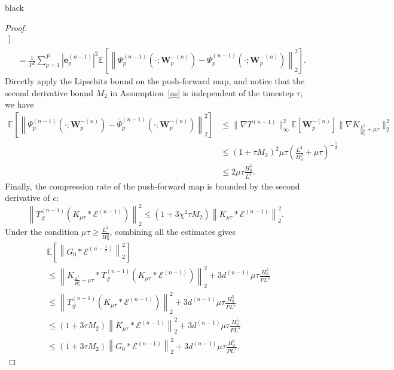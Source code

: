 \documentclass[review,onefignum,onetabnum]{siamart250211}
\begin{document}
\begin{color}{black}
\begin{proof}
\begin{equation}
\begin{aligned}
\Bigr]\\
&=\frac{1}{P^2}\sum_{p=1}^P |\mathbf{e}_p^{(n-1)}|^2\mathbb{E}\left[\left\|\Psi_p^{(n-1)}(\cdot;\mathbf{W}_p^{-(n)})-\overline{\Psi}_p^{(n-1)}(\cdot;\mathbf{W}_p^{-(n)})\right\|_2^2\right].
\end{aligned}
\end{equation}
Directly apply the Lipschitz bound on the push-forward map, and notice that the second derivative bound $M_2$ in Assumption~\ref{as} is independent of the timestep $\tau$, we have
\begin{equation}
\begin{aligned}
\mathbb{E}\left[\left\|\Psi_p^{(n-1)}(\cdot;\mathbf{W}_p^{-(n)})-\overline{\Psi}_p^{(n-1)}(\cdot;\mathbf{W}_p^{-(n)})\right\|_2^2\right]&\leq \|\nabla T^{(n-1)}\|_\infty^2 \mathbb{E}[\mathbf{W}_p^{-(n)}]\|\nabla K_{\frac{L^2}{H_0^2}+\mu\tau}\|_2^2\\
&\leq  (1+\tau M_2)^2 \mu \tau \left(\frac{L^2}{H_0^2}+\mu\tau\right)^{-\frac{5}{2}}\\
&\leq 2 \mu \tau \frac{H_0^5}{L^5}.
\end{aligned}
\end{equation}
Finally, the compression rate of the push-forward map is bounded by the second derivative of $c$:
\begin{equation}
\left\|T_\#^{(n-1)}(K_{\mu \tau} \ast \mathcal{E}^{(n-1)})\right\|_2^2 \leq (1+3\chi^2\tau M_2) \left\|K_{\mu \tau} \ast \mathcal{E}^{(n-1)}\right\|_2^2.
\end{equation}
Under the condition \(\mu \tau \geq \frac{L^2}{H_0^2}\), combining all the estimates gives
\begin{equation}
\begin{aligned}
&\mathbb{E}\left[\left\|G_0 \ast \mathcal{E}^{(n-\frac{1}{2})}\right\|_2^2\right] \\
&\leq \left\|K_{\frac{L^2}{H_0^2}+\mu \tau} \ast T_\#^{(n-1)}(K_{\mu \tau} \ast \mathcal{E}^{(n-1)} )\right\|_2^2+3d^{(n-1)}\mu\tau \frac{H_0^5}{PL^5}\\
&\leq \left\|T_\#^{(n-1)}(K_{\mu \tau} \ast \mathcal{E}^{(n-1)} )\right\|_2^2+3d^{(n-1)}\mu\tau \frac{H_0^5}{PL^5}\\
&\leq (1+3\tau M_2)\left\|K_{\mu \tau} \ast \mathcal{E}^{(n-1)}\right\|_2^2+3d^{(n-1)}\mu\tau \frac{H_0^5}{PL^5}\\
&\leq (1+3\tau M_2)\left\|G_0 \ast \mathcal{E}^{(n-1)}\right\|_2^2+3d^{(n-1)}\mu\tau \frac{H_0^5}{PL^5}.
\end{aligned}
\end{equation}


\end{proof}
\end{color}
\end{document}
